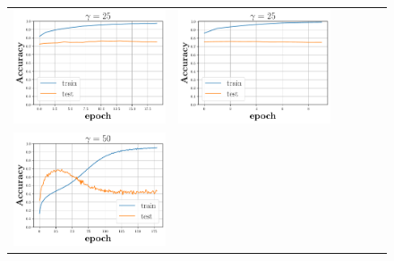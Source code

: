 \begin{figure}[h]
\begin{minipage}{0.99\columnwidth}
{\begin{tabular}{cccccc}
\includegraphics[scale=0.125]{figs/relu_25_good.pdf}&
\includegraphics[scale=0.125]{figs/galu_25_recovered.pdf}
\\
\includegraphics[scale=0.125]{figs/relu_50.pdf}&

\end{tabular}}
\end{minipage}
\end{figure}
